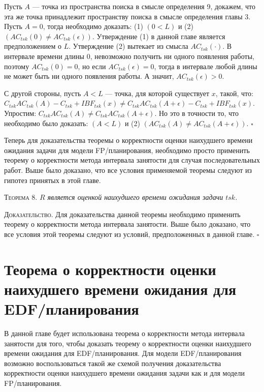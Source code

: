 \documentclass[14pt]{matmex-diploma-custom}
\begin{document}
  Пусть $A$ --- точка из пространства поиска в смысле определения 9, докажем, что 
    эта же точка принадлежит пространству поиска в смысле определения главы 3. 
   Пусть $A = 0$, тогда необходимо доказать: 
     (1) $(0 < L)$ и (2) $(AC_{tsk}(0) \neq AC_{tsk}(\epsilon))$. 
   Утверждение (1) в данной главе является предположением о $L$.
   Утверждение (2) вытекает из смысла $AC_{tsk}(\cdot)$. В интервале времени длины 0,
     невозможно получить ни одного появления работы, поэтому $AC_{tsk}(0) = 0$, 
     но если $AC_{tsk}(\epsilon) = 0$, тогда в интервале любой длины не может 
     быть ни одного появления работы. А значит, $AC_{tsk}(\epsilon) > 0$.
   
   С другой стороны, пусть $A < L$ --- точка, для которой существует $x$, такой, что:
     $C_{tsk}AC_{tsk}(A) - C_{tsk} + IBF_{tsk}(x) \neq C_{tsk}AC_{tsk}(A + \epsilon) - C_{tsk} + IBF_{tsk}(x)$.
   Упростим: $C_{tsk}AC_{tsk}(A) \neq C_{tsk}AC_{tsk}(A + \epsilon)$.
   Но это в точности то, что необходимо было доказать: $(A < L)$ и (2) $(AC_{tsk}(A) \neq AC_{tsk}(A + \epsilon))$. 
$\square$


Теперь для доказательства теоремы о корректности оценки наихудшего времени 
  ожидания задачи для модели FP\-/планирования, необходимо просто применить теорему
  о корректности метода интервала занятости для случая последовательных работ. 
  Выше было доказано, что все условия применяемой теоремы следуют из 
  гипотез принятых в этой главе. 

\textsc{Теорема 8.}
\textit{$R$ является оценкой наихудшего времени ожидания задачи $tsk$. }

\textsc{Доказательство.} 
  Для доказательства данной теоремы необходимо применить теорему о корректности метода 
    интервала занятости. Выше было доказано, что все условия этой теоремы следуют
    из условий, предположенных в данной главе. 
$\square$



\section{Теорема о корректности оценки наихудшего времени ожидания для EDF\-/планирования}

В данной главе будет использована теорема о корректности метода интервала занятости 
  для того, чтобы доказать теорему о корректности оценки наихудшего времени ожидания 
  для EDF\-/планирования. Для модели EDF\-/планирования возможно воспользоваться такой же схемой получения 
  доказательства корректности оценки наихудшего времени ожидания задачи как и для модели FP\-/планирования. 
  
\end{document}
